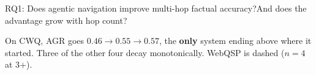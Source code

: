 {\rqtitlesize{14pt}{17.5pt}%

\begin{frame}{RQ1: Does agentic navigation improve multi-hop factual accuracy?}{And does the advantage grow with hop count?}
  \bodyshift{1.25pt}
  \centering
  \scalebox{0.92}{}

  {\small On CWQ, AGR goes $0.46 \to 0.55 \to 0.57$, the \textbf{only}
  system ending above where it started. Three of the other four decay
  monotonically. WebQSP is dashed ($n{=}4$ at 3+).\par}
\end{frame}

}

